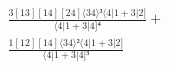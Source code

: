 \documentclass[varwidth, border=5pt]{standalone}
\begin{document}
\begin{my}
$\begin{gathered}
\scriptscriptstyle\frac{3[13][14][24]⟨34⟩³⟨4|1+3|2]}{⟨4|1+3|4]⁴} +\\
\scriptscriptstyle\frac{1[12][14]⟨34⟩²⟨4|1+3|2]}{⟨4|1+3|4]³} \phantom{+}
\end{gathered}$
\end{my}
\end{document}
